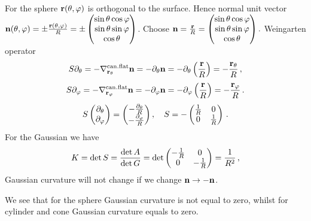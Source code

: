 \documentclass[12pt]{article}
\theoremstyle{theorem}
\numberwithin{equation}{section}
\begin{document}
{For the sphere ${\bf r}(\theta,\varphi)$ is orthogonal to the surface.
       Hence
   normal unit vector
   $   {\bf n}(\theta,\varphi)=\pm {{\bf r}(\theta,\varphi)\over R}=\pm
   \begin{pmatrix}
    \sin\theta\cos\varphi\cr
     \sin\theta\sin\varphi\cr
      \cos\theta\cr
   \end{pmatrix}$.
           Choose ${\bf n}= {{\bf r}\over R}=
   \begin{pmatrix}
    \sin\theta\cos\varphi\cr
     \sin\theta\sin\varphi\cr
      \cos\theta\cr
   \end{pmatrix}.
     $
     Weingarten operator
     \begin{equation*}\label{weingrartenforcylinder}
        S\partial_\theta=-\nabla^{\rm can.flat}_{{\bf r}_\theta}{\bf n}=-\partial_\theta {\bf n}=
          -\partial_\theta\left({{\bf r}\over R}\right)=-{{\bf r}_\theta\over R}\,,
       \end{equation*}
       \begin{equation*}\label{weingrartenforcylinder}
       S\partial_\varphi=-\nabla^{\rm can.flat}_{{\bf r}_\varphi}{\bf n}=-\partial_\varphi {\bf n}=
          -\partial_\varphi\left({{\bf r}\over R}\right)=-{{\bf r}_\varphi\over R}\,.
    \end{equation*}
\begin{equation}\label{weingrartenforcylinder2}
           S
   \begin{pmatrix}
        \partial_\theta \cr
        \partial_\varphi\cr
   \end{pmatrix}=
   \begin{pmatrix}
         -{\partial_\theta\over R}\cr
        -{\partial_\varphi\over R}\cr
   \end{pmatrix},\quad S=
        -
   \begin{pmatrix}{1\over R}&0\cr 0 &{1\over R}\end{pmatrix}\,.
    \end{equation}
For the Gaussian we have
     \begin{equation}\label{Gaussianforcylinder}
        K=\det S={\det A\over \det G}=\det
                              \begin{pmatrix}-{1\over R}&0\cr
                                0&-{1\over R}\cr
                                   \end{pmatrix}={1\over R^2}\,,
     \end{equation}
Gaussian curvature will not change if we change ${\bf n}\to -{\bf n}$.


We see that for the sphere  Gaussian curvature is not equal to 
zero, whilst for cylinder and cone Gaussian curvature
equals to zero.

}
\end{document}

